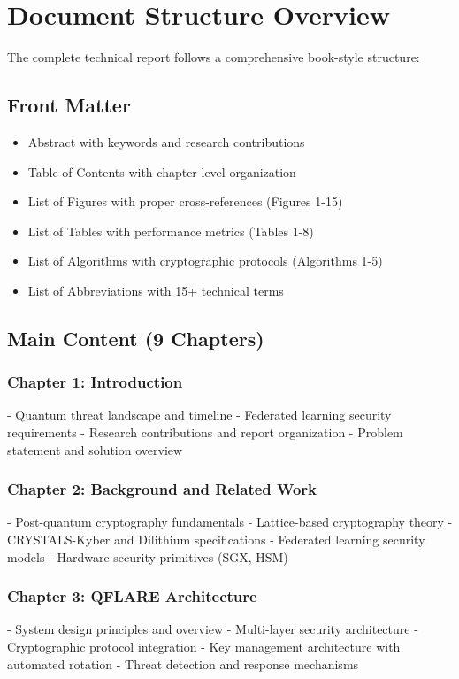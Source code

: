 \documentclass[11pt,a4paper]{article}
\begin{document}
\section{Document Structure Overview}

The complete technical report follows a comprehensive book-style structure:

\subsection{Front Matter}
\begin{itemize}
\item Abstract with keywords and research contributions
\item Table of Contents with chapter-level organization
\item List of Figures with proper cross-references (Figures 1-15)
\item List of Tables with performance metrics (Tables 1-8)
\item List of Algorithms with cryptographic protocols (Algorithms 1-5)
\item List of Abbreviations with 15+ technical terms
\end{itemize}

\subsection{Main Content (9 Chapters)}

\subsubsection{Chapter 1: Introduction}
- Quantum threat landscape and timeline
- Federated learning security requirements  
- Research contributions and report organization
- Problem statement and solution overview

\subsubsection{Chapter 2: Background and Related Work}
- Post-quantum cryptography fundamentals
- Lattice-based cryptography theory
- CRYSTALS-Kyber and Dilithium specifications
- Federated learning security models
- Hardware security primitives (SGX, HSM)

\subsubsection{Chapter 3: QFLARE Architecture}
- System design principles and overview
- Multi-layer security architecture
- Cryptographic protocol integration
- Key management architecture with automated rotation
- Threat detection and response mechanisms
\end{document}
